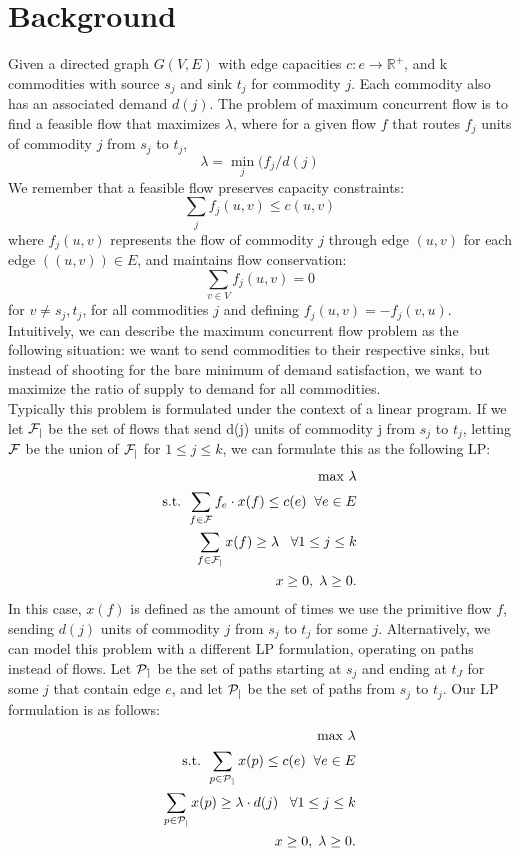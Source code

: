 \section{Background}
Given a directed graph $G(V,E)$ with edge capacities $c: e \rightarrow
\mathbb{R}^+$, and k commodities with source $s_j$ and sink $t_j$ for
commodity $j$. Each commodity also has an associated demand
$d(j)$. The problem of maximum concurrent flow is to find a feasible flow that
maximizes $\lambda$, where for a given flow $f$ that routes $f_j$
units of commodity $j$ from $s_j$ to $t_j$, 
$$\lambda = \min_{j}(f_j/d(j)$$
We remember that a feasible flow preserves capacity constraints: 
$$\sum_j f_j(u,v) \leq c(u,v)$$
where $f_j(u,v)$ represents the flow of commodity $j$ through edge
$(u,v)$ for each edge $((u,v))\in E$, and maintains flow conservation:
$$\sum_{v\in V} f_j(u,v)=0$$ 
for $v\neq s_j,t_j$, for all commodities $j$ and defining
$f_j(u,v)=-f_j(v,u)$. Intuitively, we can describe the maximum
concurrent flow problem as the following situation: we want to send
commodities to their respective sinks, but instead of shooting for the
bare minimum of demand satisfaction, we want to maximize the ratio of
supply to demand for all commodities. \\
Typically this problem is formulated under the context of a linear
program. If we let $\cal{F}_j$ be the set of flows that send d(j) units
of commodity j from $s_j$ to $t_j$, letting $\cal{F}$ be the union of
$\cal{F}_j$ for $1\leq j \leq k$, we can formulate this as the following LP:
\begin{align*}
\text{max     } \lambda \\
\text{s.t. }\sum_{f\in \cal{F}}f_e\cdot x(f) \leq c(e) \;\;\forall
e\in E \\
\sum_{f\in \cal{F}_j} x(f)\geq \lambda \;\;\;\forall 1\leq j\leq k \\
x\geq 0,\; \lambda\geq 0.
\end{align*}
In this case, $x(f)$ is defined as the amount of times we use the
primitive flow $f$, sending $d(j)$ units of commodity $j$ from $s_j$
to $t_j$ for some $j$. Alternatively, we can model this problem with a
different LP formulation, operating on paths instead of flows. Let
$\cal{P}_e$ be the set of paths starting at $s_j$ and ending at $t_J$
for some $j$ that contain edge $e$, and let
$\cal{P}_j$ be the set of paths from $s_j$ to $t_j$. Our LP
formulation is as follows:
\begin{align*}
\text{max     } \lambda \\
\text{s.t. }\sum_{p\in \cal{P}_e}x(p) \leq c(e) \;\;\forall
e\in E \\
\sum_{p\in \cal{P}_j} x(p)\geq \lambda\cdot d(j) \;\;\;\forall 1\leq j\leq k \\
x\geq 0,\; \lambda\geq 0.
\end{align*}
